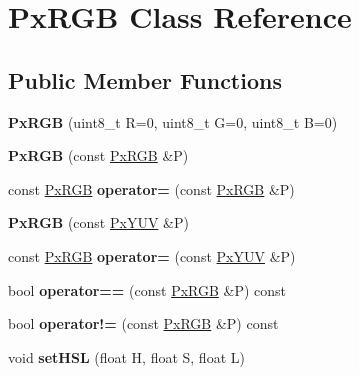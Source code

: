 \hypertarget{classPxRGB}{}\section{Px\+R\+GB Class Reference}
\label{classPxRGB}
\subsection*{Public Member Functions}
\begin{DoxyCompactItemize}
\item 
{\bfseries Px\+R\+GB} (uint8\+\_\+t R=0, uint8\+\_\+t G=0, uint8\+\_\+t B=0)\hypertarget{classPxRGB_a3ba6c319ce2a4a6a6263cfb718513a8b}{}\label{classPxRGB_a3ba6c319ce2a4a6a6263cfb718513a8b}

\item 
{\bfseries Px\+R\+GB} (const \hyperlink{classPxRGB}{Px\+R\+GB} \&P)\hypertarget{classPxRGB_a440f6a71e0a6b2c55ebb103f907a3f51}{}\label{classPxRGB_a440f6a71e0a6b2c55ebb103f907a3f51}

\item 
const \hyperlink{classPxRGB}{Px\+R\+GB} {\bfseries operator=} (const \hyperlink{classPxRGB}{Px\+R\+GB} \&P)\hypertarget{classPxRGB_aafc731d70a0165b2a26b15a353b464dc}{}\label{classPxRGB_aafc731d70a0165b2a26b15a353b464dc}

\item 
{\bfseries Px\+R\+GB} (const \hyperlink{classPxYUV}{Px\+Y\+UV} \&P)\hypertarget{classPxRGB_a0e0fb98f32094a38a8e80f17248f8879}{}\label{classPxRGB_a0e0fb98f32094a38a8e80f17248f8879}

\item 
const \hyperlink{classPxRGB}{Px\+R\+GB} {\bfseries operator=} (const \hyperlink{classPxYUV}{Px\+Y\+UV} \&P)\hypertarget{classPxRGB_af9c2896450d70ecfdd3892772322f641}{}\label{classPxRGB_af9c2896450d70ecfdd3892772322f641}

\item 
bool {\bfseries operator==} (const \hyperlink{classPxRGB}{Px\+R\+GB} \&P) const \hypertarget{classPxRGB_a3bb56ce17ded215d85d6c61558b60ddb}{}\label{classPxRGB_a3bb56ce17ded215d85d6c61558b60ddb}

\item 
bool {\bfseries operator!=} (const \hyperlink{classPxRGB}{Px\+R\+GB} \&P) const \hypertarget{classPxRGB_a32b2e65b16326dc4a3ea50fa249dfc64}{}\label{classPxRGB_a32b2e65b16326dc4a3ea50fa249dfc64}

\item 
void {\bfseries set\+H\+SL} (float H, float S, float L)\hypertarget{classPxRGB_a7b8f32532c5cfabeb265f887313c7246}{}\label{classPxRGB_a7b8f32532c5cfabeb265f887313c7246}


\end{DoxyCompactItemize}
